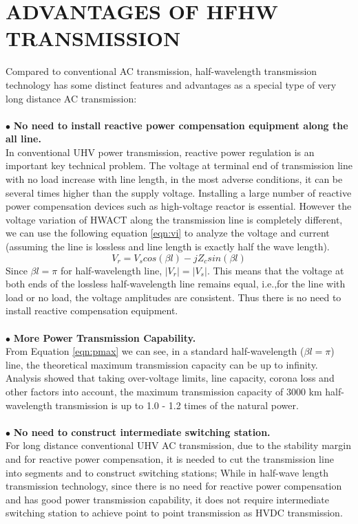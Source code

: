 \documentclass[12pt,a4paper]{reportmod}
\begin{document}
\chapter{ADVANTAGES OF HFHW TRANSMISSION}
Compared to conventional AC transmission, half-wavelength transmission technology has some distinct features and advantages as a special type of very long distance AC transmission:\\~\\
\space\space $\bullet$ \textbf{No need to install reactive power compensation equipment along the all line.}\\
In conventional UHV power transmission, reactive power regulation is an important key technical problem. The voltage at terminal end of transmission line with no load increase with line length, in the most adverse conditions, it can be several times higher than the supply voltage. Installing a large number of reactive power compensation devices such as high-voltage reactor is essential. However the voltage variation of HWACT along the transmission line is completely different, we can use the following equation \ref{eqn:vi} to analyze the voltage and current (assuming the line is lossless and line length is exactly half the wave length).
\begin{equation}\label{eqn:vi}
V_r=V_scos(\beta l)-jZ_csin(\beta l)
\end{equation} 
Since $\beta l=\pi$ for half-wavelength line, $|V_r|=|V_s|$. This means that the voltage at both ends of the lossless half-wavelength line remains equal, i.e.,for the line with load or no load, the voltage amplitudes are consistent. Thus there is no need to install reactive compensation equipment.\\~\\
\space\space $\bullet$  \textbf{More Power Transmission Capability.}\\
From Equation \ref{eqn:pmax} we can see, in a standard half-wavelength ($\beta l=\pi$) line, the theoretical maximum transmission capacity can be up to infinity. Analysis showed that taking over-voltage limits, line capacity, corona loss and other factors into account, the maximum transmission capacity of 3000 km half-wavelength transmission is up to 1.0 - 1.2 times of the natural power.\\~\\
\space\space $\bullet$ \textbf{No need to construct intermediate switching station.}\\
For long distance conventional UHV AC transmission, due to the stability margin and for reactive power compensation, it is needed to cut the transmission line into segments and to construct switching stations; While in half-wave length transmission technology, since there is no need for reactive power compensation and has good power transmission capability, it does not require intermediate switching station to achieve point to point transmission as HVDC transmission.\\~\\
\end{document}
